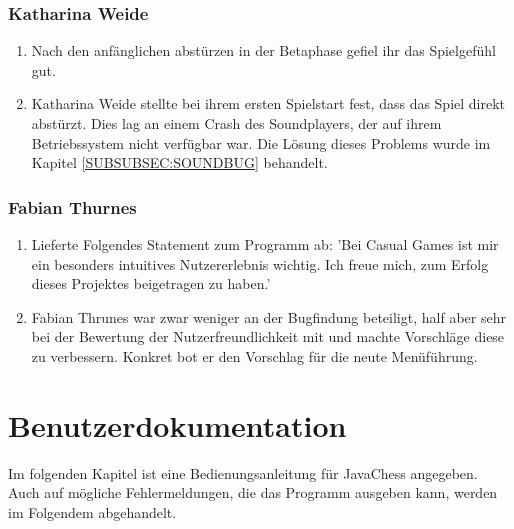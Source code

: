 \documentclass[12pt,a4paper]{article}
\begin{document}
\subsubsection{Katharina Weide}
\begin{enumerate}
	\item{Nach den anfänglichen abstürzen in der Betaphase gefiel ihr das Spielgefühl gut.}

	\item{Katharina Weide stellte bei ihrem ersten Spielstart fest, dass das Spiel direkt abstürzt. Dies lag an einem Crash des Soundplayers, der auf ihrem Betriebssystem nicht verfügbar war. Die Lösung dieses Problems wurde im Kapitel \ref{SUBSUBSEC:SOUNDBUG} behandelt.}
	
\end{enumerate}

\subsubsection{Fabian Thurnes}
\begin{enumerate}
	\item{Lieferte Folgendes Statement zum Programm ab: 'Bei Casual Games ist mir ein besonders intuitives Nutzererlebnis wichtig. Ich freue mich, zum Erfolg dieses Projektes beigetragen zu haben.'}

	\item{Fabian Thrunes war zwar weniger an der Bugfindung beteiligt, half aber sehr bei der Bewertung der Nutzerfreundlichkeit mit und machte Vorschläge diese zu verbessern. Konkret bot er den Vorschlag für die neute Menüführung.}
\end{enumerate}


\clearpage\vfill\newpage{}

\section{\sc Benutzerdokumentation}
	Im folgenden Kapitel ist eine Bedienungsanleitung für JavaChess angegeben. Auch auf mögliche Fehlermeldungen, die das Programm ausgeben kann, werden im Folgendem abgehandelt. 
	
\end{document}
